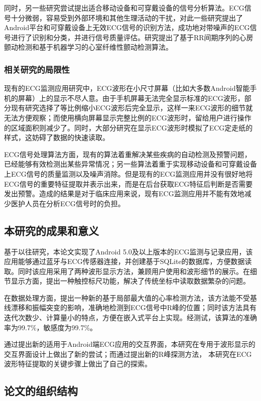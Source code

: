 同时，另一些研究尝试提出适合移动设备和可穿戴设备的信号分析算法。ECG信号十分微弱，容易受到外部环境和其他生理活动的干扰，对此一些研究提出了Android平台和可穿戴设备上无效ECG信号的识别方法，成功地对带噪声的ECG信号进行了识别和分类，并进行信号质量评估\cite{chudacek_simple_2011}\cite{satija_simple_2015}。研究\cite{oster_open_2013}提出了基于RR间期序列的心房颤动检测和基于机器学习的心室纤维性颤动检测算法。

\subsubsection{相关研究的局限性}

现有的ECG监测应用研究中，ECG波形在小尺寸屏幕（比如大多数Android智能手机的屏幕）上的显示不尽人意。由于手机屏幕无法完全显示标准的ECG波形，部分现有研究选择了等比例缩小ECG波形后完全显示，这样一来ECG波形的细节就无法方便观察；而使用横向屏幕显示完整比例的ECG波形时，留给用户进行操作的区域面积则减少了。同时，大部分研究在显示ECG波形时模拟了ECG定走纸的样式，这妨碍了数据的快速读取。

ECG信号处理算法方面，现有的算法着重解决某些疾病的自动检测及预警问题，已经能够有效检测出某些异常情况；另一些算法着重于实现移动设备和可穿戴设备上ECG信号的质量监测以及噪声消除\cite{satija_simple_2015}。但是现有的ECG监测应用并没有很好地将ECG信号的重要特征提取并表示出来，而是在后台获取ECG特征后判断是否需要发出预警。造成的结果是对于临床应用来说，现有ECG监测应用并不能有效地减少医护人员在分析ECG信号时的负担。

\subsection{本研究的成果和意义}

基于以往研究，本论文实现了Android 5.0及以上版本的ECG监测与记录应用，该应用能够通过蓝牙与ECG传感器连接，并创建基于SQLite的数据库，方便数据读取。同时该应用采用了两种波形显示方法，兼顾用户使用和波形细节的展示。在细节显示方面，提出一种触控标尺功能，解决了传统坐标中读取数据繁杂的问题。

在数据处理方面，提出一种新的基于局部最大值的心率检测方法，该方法能不受基线漂移和振幅突变的影响，准确地检测到ECG信号中R峰的位置；同时该方法具有迭代次数少、计算量小的特点，方便在嵌入式平台上实现。经测试，该算法的准确率为99.7\%，敏感度为99.7\%。

通过提出新的适用于Android端ECG应用的交互界面，本研究在专用于波形显示的交互界面设计上做出了新的尝试；而通过提出新的R峰探测方法， 本研究在ECG波形特征提取的关键步骤上做出了自己的探索。

\subsection{论文的组织结构}

